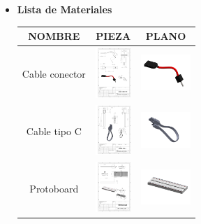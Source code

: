     
    \begin{itemize}
    \item \textbf{Lista de Materiales}  
    \begin{table} [H]
          
      \huge
      \tiny 
      \begin{tabular}   {| c |  c |  c | }
      
      \hline
      NOMBRE & PIEZA  & PLANO \\
      \hline 
      Cable conector &  \includegraphics[height=19mm]{1/img/cable conetor.pdf}  & 
       \includegraphics[width=19mm]{1/img/cable conetor_1.pdf} \\
        \hline
        Cable tipo C &  \includegraphics[height=19mm]{1/img/Cable tipo C.pdf}  & 
       \includegraphics[width=19mm]{1/img/Cable tipo C_1.pdf} \\
        \hline
      Protoboard &  \includegraphics[height=19mm]{1/img/Protoboard.pdf}  & 
       \includegraphics[width=19mm]{1/img/Protoboard_1.pdf} \\

\end{tabular}
\end{table}
\end{itemize}
